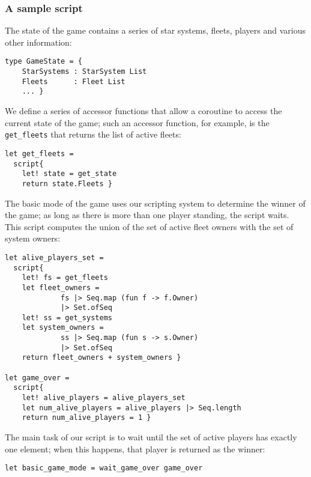 
\subsubsection{A sample script}

The state of the game contains a series of star systems, fleets, players and various other information:

\begin{lstlisting}
type GameState = {
    StarSystems : StarSystem List
    Fleets      : Fleet List
    ... }
\end{lstlisting}

We define a series of accessor functions that allow a coroutine to access the current state of the game; such an accessor function, for example, is the \texttt{get\_fleets} that returns the list of active fleets:

\begin{lstlisting}
let get_fleets = 
  script{
    let! state = get_state
    return state.Fleets }
\end{lstlisting}

The basic mode of the game uses our scripting system to determine the winner of the game; as long as there is more than one player standing, the script waits. This script computes the union of the set of active fleet owners with the set of system owners:  

\begin{lstlisting}
let alive_players_set = 
  script{
    let! fs = get_fleets
    let fleet_owners = 
             fs |> Seq.map (fun f -> f.Owner) 
             |> Set.ofSeq
    let! ss = get_systems
    let system_owners = 
             ss |> Seq.map (fun s -> s.Owner) 
             |> Set.ofSeq
    return fleet_owners + system_owners }

let game_over =
  script{
    let! alive_players = alive_players_set
    let num_alive_players = alive_players |> Seq.length
    return num_alive_players = 1 }
\end{lstlisting}

The main task of our script is to wait until the set of active players has exactly one element; when this happens, that player is returned as the winner: 

\begin{lstlisting}
let basic_game_mode = wait_game_over game_over
\end{lstlisting}

